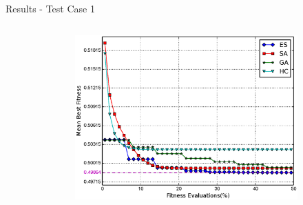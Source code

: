 \documentclass{beamer}
\begin{document}
\begin{frame}{Results - Test Case 1}
\begin{columns}
\begin{column}{.5\columnwidth}
        \end{column}
        \begin{column}{.6\columnwidth}
            \begin{figure}
                \begin{subfigure}{\columnwidth}
                    \includegraphics[width=\columnwidth, height=\columnwidth]{../paper/FIG/tc1_mf}%
                \end{subfigure}\hfill\\%
            \end{figure}
        \end{column}
    \end{columns}
\end{frame}
\end{document}
